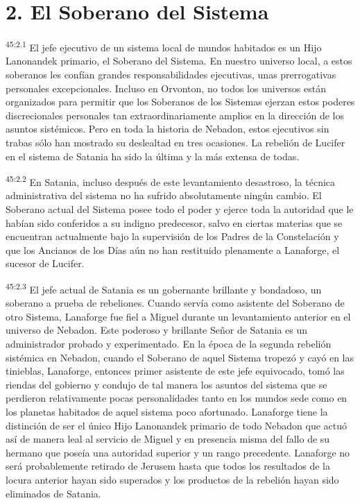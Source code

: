 \section*{2. El Soberano del Sistema}
\par
\textsuperscript{45:2.1} El jefe ejecutivo de un sistema local de mundos habitados es un Hijo Lanonandek primario, el Soberano del Sistema. En nuestro universo local, a estos soberanos les confían grandes responsabilidades ejecutivas, unas prerrogativas personales excepcionales. Incluso en Orvonton, no todos los universos están organizados para permitir que los Soberanos de los Sistemas ejerzan estos poderes discrecionales personales tan extraordinariamente amplios en la dirección de los asuntos sistémicos. Pero en toda la historia de Nebadon, estos ejecutivos sin trabas sólo han mostrado su deslealtad en tres ocasiones. La rebelión de Lucifer en el sistema de Satania ha sido la última y la más extensa de todas.

\par
\textsuperscript{45:2.2} En Satania, incluso después de este levantamiento desastroso, la técnica administrativa del sistema no ha sufrido absolutamente ningún cambio. El Soberano actual del Sistema posee todo el poder y ejerce toda la autoridad que le habían sido conferidos a su indigno predecesor, salvo en ciertas materias que se encuentran actualmente bajo la supervisión de los Padres de la Constelación y que los Ancianos de los Días aún no han restituido plenamente a Lanaforge, el sucesor de Lucifer.

\par
\textsuperscript{45:2.3} El jefe actual de Satania es un gobernante brillante y bondadoso, un soberano a prueba de rebeliones. Cuando servía como asistente del Soberano de otro Sistema, Lanaforge fue fiel a Miguel durante un levantamiento anterior en el universo de Nebadon. Este poderoso y brillante Señor de Satania es un administrador probado y experimentado. En la época de la segunda rebelión sistémica en Nebadon, cuando el Soberano de aquel Sistema tropezó y cayó en las tinieblas, Lanaforge, entonces primer asistente de este jefe equivocado, tomó las riendas del gobierno y condujo de tal manera los asuntos del sistema que se perdieron relativamente pocas personalidades tanto en los mundos sede como en los planetas habitados de aquel sistema poco afortunado. Lanaforge tiene la distinción de ser el único Hijo Lanonandek primario de todo Nebadon que actuó así de manera leal al servicio de Miguel y en presencia misma del fallo de su hermano que poseía una autoridad superior y un rango precedente. Lanaforge no será probablemente retirado de Jerusem hasta que todos los resultados de la locura anterior hayan sido superados y los productos de la rebelión hayan sido eliminados de Satania.

